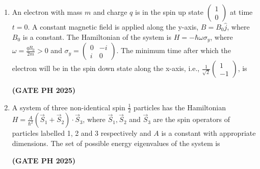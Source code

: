 \documentclass[14pt, a4paper]{extarticle}
\renewcommand{\vec}[1]{\overrightarrow{#1}}
\begin{document}
\begin{enumerate}[label=\textbf{Q.\arabic*}]
\item An electron with mass $m$ and charge $q$ is in the spin up state $\begin{pmatrix} 1 \\ 0 \end{pmatrix}$ at time $t=0$. A constant magnetic field is applied along the y-axis, $B = B_0\hat{j}$, where $B_0$ is a constant. The Hamiltonian of the system is $H = -\hbar\omega\sigma_y$, where $\omega = \frac{qB_0}{2m} > 0$ and $\sigma_y = \begin{pmatrix} 0 & -i \\ i & 0 \end{pmatrix}$. The minimum time after which the electron will be in the spin down state along the x-axis, i.e., $\frac{1}{\sqrt{2}}\begin{pmatrix} 1 \\ -1 \end{pmatrix}$, is
\begin{enumerate}
\end{enumerate}
\hfill \textbf{(GATE PH 2025)}

\item A system of three non-identical spin $\frac{1}{2}$ particles has the Hamiltonian $H = \frac{A}{\hbar^2}(\vec{S}_1 + \vec{S}_2)\cdot\vec{S}_3$, where $\vec{S}_1, \vec{S}_2$ and $\vec{S}_3$ are the spin operators of particles labelled 1, 2 and 3 respectively and $A$ is a constant with appropriate dimensions. The set of possible energy eigenvalues of the system is
\begin{enumerate}
\end{enumerate}
\hfill \textbf{(GATE PH 2025)}


\end{enumerate}
\end{document}
